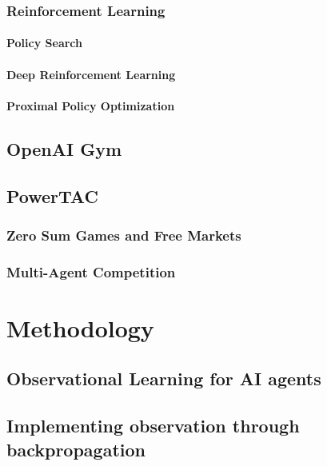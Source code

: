 \subsection{Reinforcement Learning}
\subsubsection{Policy Search}
\subsubsection{Deep Reinforcement Learning}
\subsubsection{Proximal Policy Optimization}


\section{OpenAI Gym}
\section{PowerTAC}
\subsection{Zero Sum Games and Free Markets}
\subsection{Multi-Agent Competition}


\chapter{Methodology}

\section{Observational Learning for AI agents}
\section{Implementing observation through backpropagation}

